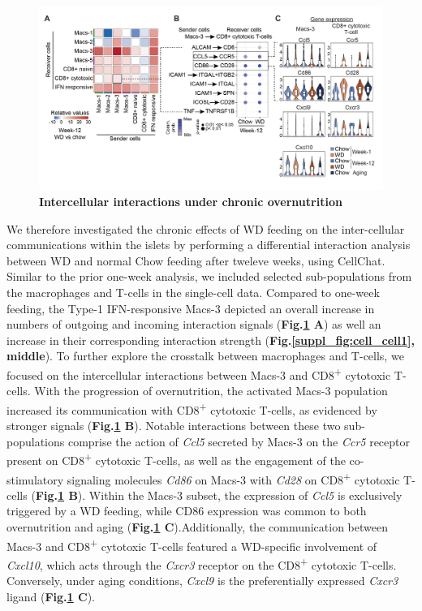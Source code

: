 \begin{figure}[H]
\centering
\includegraphics[width=\linewidth]{Chapter4/Fig/F2-7-01.png}
\caption[res-cciw12]{\textbf{Intercellular interactions under chronic overnutrition}\\

}
\label{fig2-7}
\end{figure}

We therefore investigated the chronic effects of WD feeding on the inter-cellular communications within the islets by performing a differential interaction analysis between WD and normal Chow feeding after tweleve weeks, using CellChat. Similar to the prior one-week analysis, we included selected sub-populations from the macrophages and T-cells in the single-cell data. Compared to one-week feeding, the Type-1 IFN-responsive Macs-3 depicted an overall increase in numbers of outgoing and incoming interaction signals (\textbf{Fig.\ref{fig2-7} A}) as well an increase in their corresponding interaction strength (\textbf{Fig.\ref{suppl_fig:cell_cell1}, middle}). To further explore the crosstalk between macrophages and T-cells, we focused on the intercellular interactions between Macs-3 and CD8\textsuperscript{+} cytotoxic T-cells. With the progression of overnutrition, the activated Macs-3 population increased its communication with CD8\textsuperscript{+} cytotoxic T-cells, as evidenced by stronger signals (\textbf{Fig.\ref{fig2-7} B}). Notable interactions between these two sub-populations comprise the action of \textit{Ccl5} secreted by Macs-3 on the \textit{Ccr5} receptor present on CD8\textsuperscript{+} cytotoxic T-cells, as well as the engagement of the co-stimulatory signaling molecules \textit{Cd86} on Macs-3 with \textit{Cd28} on CD8\textsuperscript{+} cytotoxic T-cells (\textbf{Fig.\ref{fig2-7} B}). Within the Macs-3 subset, the expression of \textit{Ccl5} is exclusively triggered by a WD feeding, while CD86 expression was common to both overnutrition and aging (\textbf{Fig.\ref{fig2-7} C}).Additionally, the communication between Macs-3 and CD8\textsuperscript{+} cytotoxic T-cells featured a WD-specific involvement of \textit{Cxcl10}, which acts through the \textit{Cxcr3} receptor on the CD8\textsuperscript{+} cytotoxic T-cells. Conversely, under aging conditions, \textit{Cxcl9} is the preferentially expressed \textit{Cxcr3} ligand (\textbf{Fig.\ref{fig2-7} C}).\\

